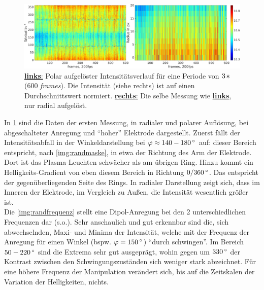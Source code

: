 \documentclass[numbers=noenddot,a4paper]{scrartcl}
\newcommand{\degree}{^\circ}
\newcommand{\tilt}[1]{\textit{#1}}
\newcommand{\fett}[1]{\textbf{#1}}
\begin{document}
					\begin{figure}[!t]
						\centering
						\includegraphics[width=\textwidth,height=0.4\textwidth]{figs/auswertung/randungest3sekwinkurad.png}
						\caption{\underline{\fett{links}:} Polar aufgelöster Intensitätsverlauf für eine Periode von $\unit[3]{s}$ (600 \tilt{frames}). Die Intensität (siehe rechts) ist auf einen Durchschnittswert normiert. \underline{\fett{rechts}:} Die selbe Messung wie \underline{\fett{links}}, nur radial aufgelöst. }
						\label{img:randungest}
					\end{figure}

			In \ref{img:randungest} sind die Daten der ersten Messung, in radialer und polarer Auflösung, bei abgeschalteter Anregung und "`hoher"' Elektrode dargestellt. Zuerst fällt der Intensitätsabfall in der Winkeldarstellung bei $\varphi\approx\unit[140-180]{\degree}$ auf: dieser Bereich entspricht, nach \ref{img:randmaske}, in etwa der Richtung des Arm der Elektrode. Dort ist das Plasma-Leuchten schwächer als am übrigen Ring. Hinzu kommt ein Helligkeits-Gradient von eben diesem Bereich in Richtung $\unit[0/360]{\degree}$. Das entspricht der gegenüberliegenden Seite des Rings. In radialer Darstellung zeigt sich, dass im Inneren der Elektrode, im Vergleich zu Außen, die Intensität wesentlich größer ist.\\
			Die \ref{img:randfrequenz} stellt eine Dipol-Anregung bei den 2 unterschiedlichen Frequenzen dar (s.o.).  Sehr anschaulich und gut erkennbar sind die, sich abwechselnden, Maxi- und Minima der Intensität, welche mit der Frequenz der Anregung für einen Winkel (bspw. $\varphi=\unit[150]{\degree}$) "`durch schwingen"'. Im Bereich $\unit[50-220]{\degree}$ sind die Extrema sehr gut ausgeprägt, wohin gegen um $\unit[330]{\degree}$ der Kontrast zwischen den Schwingungszuständen sich weniger stark abzeichnet. Für eine höhere Frequenz der Manipulation verändert sich, bis auf die Zeitskalen der Variation der Helligkeiten, nichts.
\end{document}
